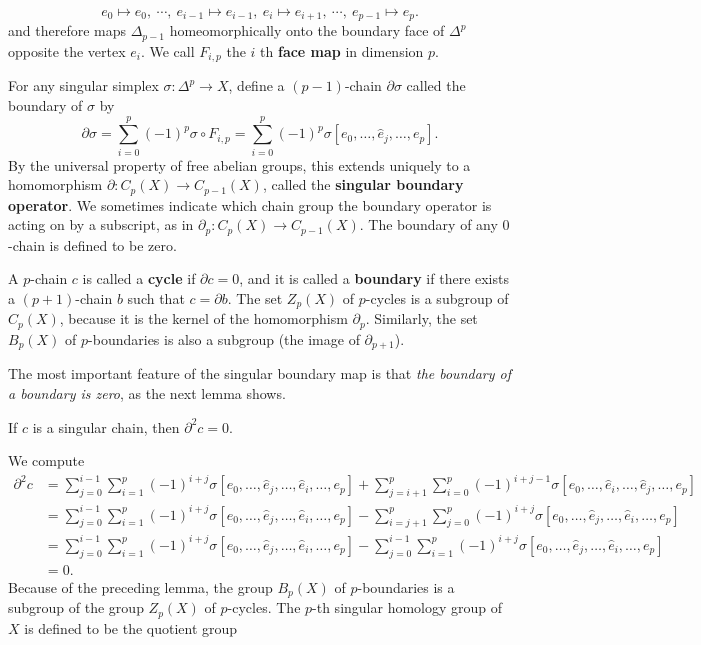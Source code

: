 \[e_0\mapsto e_0,\ \cdots,\ e_{i-1}\mapsto e_{i-1},\ e_i\mapsto e_{i+1},\ \cdots,\ e_{p-1}\mapsto e_p.\]
and therefore maps $\Delta_{p-1}$ homeomorphically onto the boundary face of $\Delta^p$ opposite the vertex $e_i$. We call $F_{i,p}$ the $i$ th \textbf{face map} in dimension $p$.\par
For any singular simplex $\sigma:\Delta^p\to X$, define a $(p-1)$-chain $\partial\sigma$ called the boundary of $\sigma$ by
\[\partial\sigma=\sum_{i=0}^{p}(-1)^p\sigma\circ F_{i,p}=\sum_{i=0}^{p}(-1)^p\sigma[e_0,\dots,\widehat{e}_j,\dots,e_p].\]
By the universal property of free abelian groups, this extends uniquely to a homomorphism $\partial:C_p(X)\to C_{p-1}(X)$, called the \textbf{singular boundary operator}. We sometimes indicate which chain group the boundary operator is acting on by a subscript, as in $\partial_p:C_p(X)\to C_{p-1}(X)$. The boundary of any $0$-chain is defined to be zero.\par
A $p$-chain $c$ is called a \textbf{cycle} if $\partial c=0$, and it is called a \textbf{boundary} if there exists a $(p+1)$-chain $b$ such that $c=\partial b$. The set $Z_p(X)$ of $p$-cycles is a subgroup of $C_p(X)$, because it is the kernel of the homomorphism $\partial_p$. Similarly, the set $B_p(X)$ of $p$-boundaries is also a subgroup (the image of $\partial_{p+1}$).\par
The most important feature of the singular boundary map is that \textit{the boundary of a boundary is zero}, as the next lemma shows.
\begin{lemma}
If $c$ is a singular chain, then $\partial^2c=0$.
\end{lemma}
We compute
\begin{align*}
\partial^2c&=\sum_{j=0}^{i-1}\sum_{i=1}^{p}(-1)^{i+j}\sigma[e_0,\dots,\widehat{e}_j,\dots,\widehat{e}_i,\dots,e_p]+\sum_{j=i+1}^{p}\sum_{i=0}^{p}(-1)^{i+j-1}\sigma[e_0,\dots,\widehat{e}_i,\dots,\widehat{e}_j,\dots,e_p]\\
&=\sum_{j=0}^{i-1}\sum_{i=1}^{p}(-1)^{i+j}\sigma[e_0,\dots,\widehat{e}_j,\dots,\widehat{e}_i,\dots,e_p]-\sum_{i=j+1}^{p}\sum_{j=0}^{p}(-1)^{i+j}\sigma[e_0,\dots,\widehat{e}_j,\dots,\widehat{e}_i,\dots,e_p]\\
&=\sum_{j=0}^{i-1}\sum_{i=1}^{p}(-1)^{i+j}\sigma[e_0,\dots,\widehat{e}_j,\dots,\widehat{e}_i,\dots,e_p]-\sum_{j=0}^{i-1}\sum_{i=1}^{p}(-1)^{i+j}\sigma[e_0,\dots,\widehat{e}_j,\dots,\widehat{e}_i,\dots,e_p]\\
&=0.
\end{align*}
Because of the preceding lemma, the group $B_p(X)$ of $p$-boundaries is a subgroup of the group $Z_p(X)$ of $p$-cycles. The $p$-th singular homology group of $X$ is defined to be the quotient group
